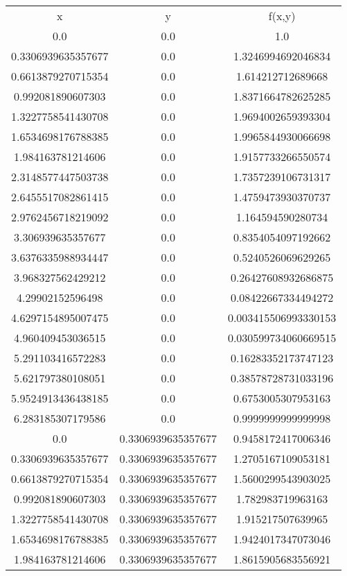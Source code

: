 \begin{table}
\begin{tabular}{ccc}
x & y & f(x,y) \\
0.0 & 0.0 & 1.0 \\
0.3306939635357677 & 0.0 & 1.3246994692046834 \\
0.6613879270715354 & 0.0 & 1.614212712689668 \\
0.992081890607303 & 0.0 & 1.8371664782625285 \\
1.3227758541430708 & 0.0 & 1.9694002659393304 \\
1.6534698176788385 & 0.0 & 1.9965844930066698 \\
1.984163781214606 & 0.0 & 1.9157733266550574 \\
2.3148577447503738 & 0.0 & 1.7357239106731317 \\
2.6455517082861415 & 0.0 & 1.4759473930370737 \\
2.9762456718219092 & 0.0 & 1.164594590280734 \\
3.306939635357677 & 0.0 & 0.8354054097192662 \\
3.6376335988934447 & 0.0 & 0.5240526069629265 \\
3.968327562429212 & 0.0 & 0.26427608932686875 \\
4.29902152596498 & 0.0 & 0.08422667334494272 \\
4.6297154895007475 & 0.0 & 0.003415506993330153 \\
4.960409453036515 & 0.0 & 0.030599734060669515 \\
5.291103416572283 & 0.0 & 0.16283352173747123 \\
5.621797380108051 & 0.0 & 0.38578728731033196 \\
5.9524913436438185 & 0.0 & 0.6753005307953163 \\
6.283185307179586 & 0.0 & 0.9999999999999998 \\
0.0 & 0.3306939635357677 & 0.9458172417006346 \\
0.3306939635357677 & 0.3306939635357677 & 1.2705167109053181 \\
0.6613879270715354 & 0.3306939635357677 & 1.5600299543903025 \\
0.992081890607303 & 0.3306939635357677 & 1.782983719963163 \\
1.3227758541430708 & 0.3306939635357677 & 1.915217507639965 \\
1.6534698176788385 & 0.3306939635357677 & 1.9424017347073046 \\
1.984163781214606 & 0.3306939635357677 & 1.8615905683556921 \\

\end{tabular}
\end{table}
